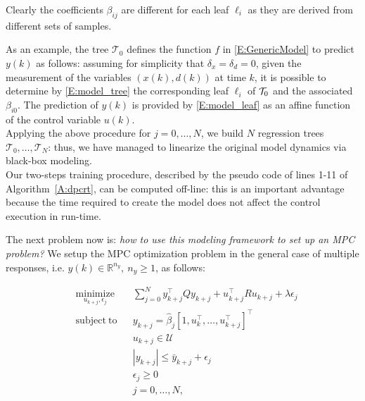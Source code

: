 {\begin{enumerate}
\begin{equation}
	\end{equation}
	Clearly the coefficients $\beta_{ij}$ are different for each leaf $\ell_i$ as they are derived from different sets of samples.
\end{enumerate}
As an example, the tree $\mathcal{T}_0$ defines the function $f$ in \eqref{E:GenericModel} to predict $y(k)$ as follows: assuming for simplicity that $\delta_x = \delta_d = 0$, given the measurement of the variables $(x(k), d(k))$ at time $k$, it is possible to determine by \eqref{E:model_tree} the corresponding leaf $\ell_i$ of $\mathcal{T}_0$ and the associated $\beta_{i0}$. The prediction of $y(k)$ is provided by \eqref{E:model_leaf} as an affine function of the control variable $u(k)$.\\
Applying the above procedure for $j=0,\ldots,N$, we build $N$ regression trees $\mathcal{T}_0,\ldots,\mathcal{T}_N$: thus, we have managed to linearize the original model dynamics via black-box modeling.\\ 
Our two-steps training procedure, described by the pseudo code of lines 1-11 of Algorithm~\ref{A:dpcrt}, can be computed off-line: this is an important advantage because the time required to create the model does not affect the control execution in run-time.}

\textcolor[rgb]{0,0,1}{The next problem now is: \emph{how to use this modeling framework to set up an MPC problem?} We setup the MPC optimization problem in the general case of multiple responses, i.e. $y(k)\in\mathbb{R}^{n_y},\ n_y\geq 1$, as follows:}
\begin{problem}\label{P:dpcrt}
	\begin{equation}
		\begin{aligned}
		& \underset{u_{k+j},\epsilon_j}{\mathrm{minimize}} & & \sum_{j=0}^{N} y^\top_{k+j} Q y_{k+j} + u^\top_{k+j} R u_{k+j} + \lambda\epsilon_j \\
		& \mathrm{subject\ to }                 & & y_{k+j}     =   \hat \beta_{j} [1,u^\top_{k},\ldots,u^\top_{k+j} ]^\top                       \\
		&                                       & & u_{k+j}    \in  \mathcal{U}                                                                   \\
		&                                       & & |y_{k+j}|  \leq \bar{y}_{k+j} + \epsilon_j 										              \\
		&                                       & & \epsilon_j \geq  0							                                                  \\
		&                                       & & j           =    0,\ldots,N,               									                  \\
		\end{aligned}
		\label{E:dpcrt}
	\end{equation}
\end{problem}

